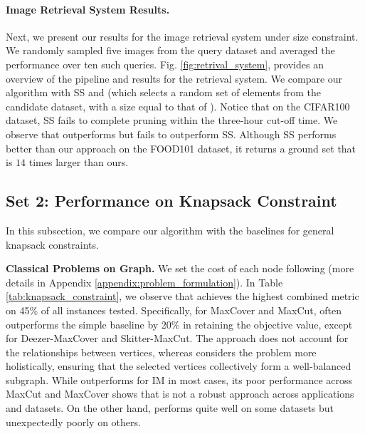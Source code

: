 \paragraph{Image Retrieval System Results.}

Next, we present our results for the image retrieval system under size constraint. We randomly sampled five images from the query dataset and averaged the performance over ten such queries. Fig. \ref{fig:retrival_system}, provides an overview of the pipeline and results for the retrieval system. We compare our algorithm with SS and \random{} (which selects a random set of elements from the candidate dataset, with a size equal to that of \qs{}). Notice that on the CIFAR100 dataset, SS fails to complete pruning within the three-hour cut-off time. We observe that \qs{} outperforms \random{} but fails to outperform SS. Although SS performs better than our approach on the FOOD101 dataset, it returns a ground set that is $14$ times larger than ours.
\subsection{Set 2: Performance on Knapsack Constraint}\label{sec:knapsack}
In this subsection, we compare our algorithm with the baselines for general knapsack constraints.

\textbf{Classical Problems on Graph.} We set the cost of each node following \cite{yaroslavtsev2020bring} (more details in Appendix \ref{appendix:problem_formulation}). In Table \ref{tab:knapsack_constraint}, we observe that \qs achieves the highest combined metric on 45\% of all instances tested. Specifically, for MaxCover and MaxCut, \qs often outperforms the simple baseline \topk{} by 20\% in retaining the objective value, except for Deezer-MaxCover and Skitter-MaxCut. The \topk{} approach does not account for the relationships between vertices, whereas \qs considers the problem more holistically, ensuring that the selected vertices collectively form a well-balanced subgraph. While \topk outperforms \qs for IM in most cases, its poor performance across MaxCut and MaxCover shows that \topk is not a robust approach across applications and datasets. On the other hand, \gnn performs quite well on some datasets but unexpectedly poorly on others.

